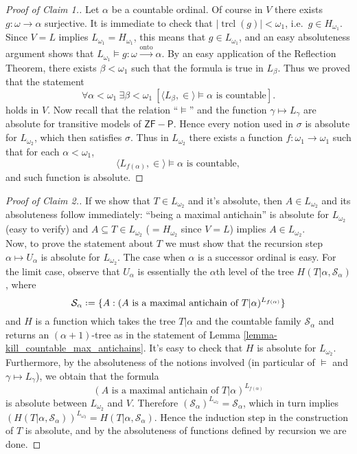 \documentclass[12pt,a4paper]{report}
\theoremstyle{definition}
\theoremstyle{num.custom-title}
\DeclareMathOperator{\sse}{\subseteq}
\DeclareMathOperator{\trcl}{trcl}
\newcommand{\onto}{\xrightarrow{\text{onto}}}
\newcommand*{\defeq}{\mathrel{\rlap{%
                     \raisebox{0.3ex}{$\cdot$}}%
                     \raisebox{-0.3ex}{$\cdot$}}%
                     =}
\renewcommand{\S}{\mathcal{S}}
\begin{document}
\begin{proof}[Proof of Claim 1.]
\renewcommand{\qedsymbol}{$\blacksquare$}
Let $\alpha$ be a countable ordinal. Of course in $V$ there exists $g \colon \omega \to \alpha$ surjective. It is immediate to check that $|{\trcl(g)}| < \omega_1$, i.e.\ $g \in H_{\omega_1}$. Since $V=L$ implies $L_{\omega_1} = H_{\omega_1}$, this means that $g \in L_{\omega_1}$, and an easy absoluteness argument shows that $L_{\omega_1} \models g \colon \omega \onto \alpha$. By an easy application of the Reflection Theorem, there exists $\beta < \omega_1$ such that the formula is true in $L_\beta$. Thus we proved that the statement
\[
\forall \alpha < \omega_1 \ \exists \beta < \omega_1 \ [ \langle L_\beta, \in \rangle \models \alpha \text{ is countable}]. \tag{$\sigma$}
\]
holds in $V$. Now recall that the relation ``$\models$'' and the function $\gamma \mapsto L_\gamma$ are absolute for transitive models of $\mathsf{ZF-P}$. Hence every notion used in $\sigma$ is absolute for $L_{\omega_2}$, which then satisfies $\sigma$. Thus in $L_{\omega_2}$ there exists a function $f \colon \omega_1 \to \omega_1$ such that for each $\alpha < \omega_1$,
\[
\langle L_{f(\alpha)}, \in \rangle \models \alpha \text{ is countable},
\]
and such function is absolute.
\end{proof}

\begin{proof}[Proof of Claim 2.]
\renewcommand{\qedsymbol}{$\blacksquare$}
If we show that $T \in L_{\omega_2}$ and it's absolute, then $A \in L_{\omega_2}$ and its absoluteness follow immediately: ``being a maximal antichain'' is absolute for $L_{\omega_2}$ (easy to verify) and $A \sse T \in L_{\omega_2}$ ($= H_{\omega_2}$ since $V=L$) implies $A \in L_{\omega_2}$.\\
Now, to prove the statement about $T$ we must show that the recursion step $\alpha \mapsto U_\alpha$ is absolute for $L_{\omega_2}$. The case when $\alpha$ is a successor ordinal is easy. For the limit case, observe that $U_\alpha$ is essentially the $\alpha$th level of the tree $H(T|\alpha, \S_\alpha)$, where 
\[
\S_\alpha \defeq \{A : (A \text{ is a maximal antichain of } T|\alpha)^{L_{f(\alpha)}}\}
\]
and $H$ is a function which takes the tree $T|\alpha$ and the countable family $\S_\alpha$ and returns an $(\alpha+1)$-tree as in the statement of Lemma \ref{lemma-kill_countable_max_antichains}. It's easy to check that $H$ is absolute for $L_{\omega_2}$. Furthermore, by the absoluteness of the notions involved (in particular of $\models$ and $\gamma \mapsto L_\gamma$), we obtain that the formula
\[
(A \text{ is a maximal antichain of } T|\alpha)^{L_{f(\alpha)}}
\]
is absolute between $L_{\omega_2}$ and $V$. Therefore $(\S_\alpha)^{L_{\omega_2}} = \S_\alpha$, which in turn implies $(H(T|\alpha, \S_\alpha))^{L_{\omega_2}} = H(T|\alpha, \S_\alpha)$. Hence the induction step in the construction of $T$ is absolute, and by the absoluteness of functions defined by recursion we are done.
\end{proof}
\end{document}
